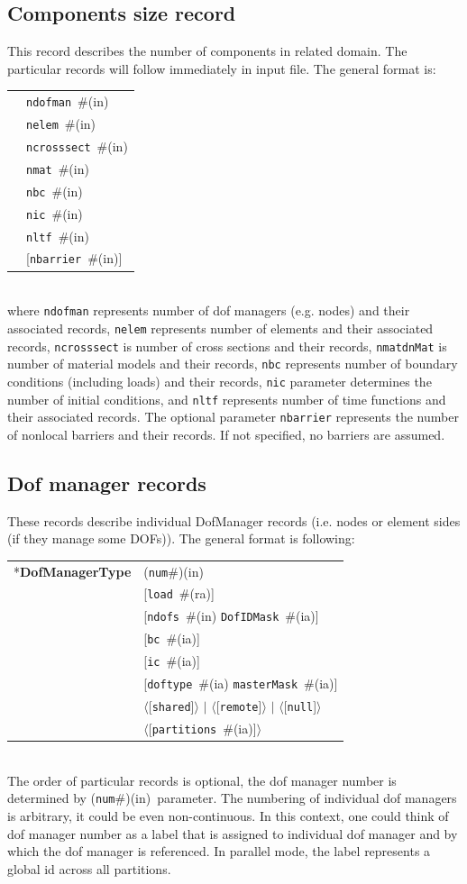 \documentclass[a4paper]{article}
\makeatletter
\newcommand{\param}[1]{\texttt{#1}} %
\newcommand{\optional}[1]{[#1]} %
\newcommand{\field}[2]{\param{#1}~\#{\tiny(#2)}} %
\newcommand{\optField}[2]{\optional{\field{#1}{#2}}}
\newcommand{\optFieldnotype}[1]{[\param{#1}]}
\newcommand{\componentNum}{(\param{num}\#){\tiny(in)}} %
\newcommand{\entKeyword}[1]{*\textbf{#1}} %
\newcommand{\Pmode}[1]{{\sffamily #1}}
\renewcommand{\parallel}[1]{$\langle${#1}$\rangle$}
\newcommand{\PoptField      }[2]{\parallel{\optField{#1}{#2}}}
\newcommand{\PoptFieldnotype}[1]{\parallel{\optFieldnotype{#1}}}
\newenvironment{record}[1][]{\begin{tabular}{|ll}}{\end{tabular}\\}
\newcommand{\recentry}[2]{{#1}&{#2}\\}
\newcounter{rcc}
\newenvironment{record}[1][\textwidth]{\setcounter{rcc}{0}\begin{tabular*}{#1}{|ll@{\extracolsep{\fill}}r}}{\end{tabular*}\\}
\newcommand{\recentry}[2]{\ifthenelse{\value{rcc}>0}{&$\backslash$ \\}{\setcounter{rcc}{1}}{#1}&{#2}}
\makeatother
\begin{document}
\subsection{Components size record}
\label{_ComponentsSizeRecord}
This record describes the number of components in related domain. The
particular records will follow immediately in input file. The general format is:\\
\begin{record}
  \recentry{}{\field{ndofman}{in}}
  \recentry{}{\field{nelem}{in}}
  \recentry{}{\field{ncrosssect}{in}}
  \recentry{}{\field{nmat}{in}}
  \recentry{}{\field{nbc}{in}}
  \recentry{}{\field{nic}{in}}
  \recentry{}{\field{nltf}{in}}
  \recentry{}{\optField{nbarrier}{in}}
\end{record}
where \param{ndofman} represents number of dof managers (e.g. nodes) and their associated records,
\param{nelem} represents number of elements and their associated records, \param{ncrosssect} is
number of cross sections and their records, \param{nmatdnMat}{} is number of material
models and their records, \param{nbc}{} represents number of boundary
conditions (including loads) and their
records, \param{nic} parameter determines the number of initial
conditions, and \param{nltf} represents number of time functions and
their associated records. The optional parameter \param{nbarrier}
represents the number of nonlocal barriers and their records. If not
specified, no barriers are assumed.

\subsection{Dof manager records}
\label{_NodeElementSideRecords}
These records describe individual DofManager records (i.e. nodes or element sides (if they manage some DOFs)). The general format is following:

\noindent
\begin{record}
  \recentry{\entKeyword{DofManagerType}}{\componentNum}
  \recentry{}{[\field{load}{ra}]}
  \recentry{}{[\field{ndofs}{in} \field{DofIDMask}{ia}]}
  \recentry{}{\optField{bc}{ia}}
  \recentry{}{\optField{ic}{ia}}
  \recentry{}{[\field{doftype}{ia} \field{masterMask}{ia}]}
  \recentry{}{\PoptFieldnotype{shared} $|$ \PoptFieldnotype{remote} $|$ \PoptFieldnotype{null}}
  \recentry{}{\PoptField{partitions}{ia}}
\end{record}
The order of particular records is optional, the dof manager number is determined by \componentNum\ parameter.
The numbering of individual dof managers is arbitrary, it could be even non-continuous. In this context, one could think of dof manager number as a label that is assigned to individual dof manager and by which the dof manager is referenced.
\Pmode{In parallel mode, the label represents a global id across all partitions.}
\end{document}
